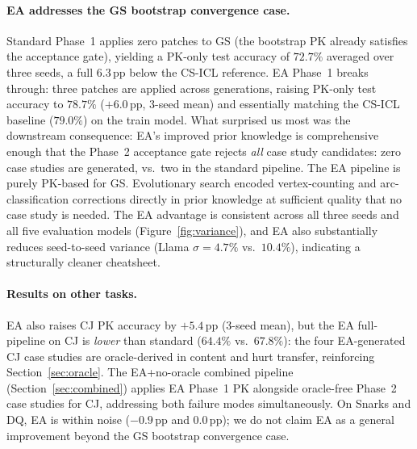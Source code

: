 \documentclass{article}
\begin{document}
\paragraph{EA addresses the GS bootstrap convergence case.}
Standard Phase~1 applies zero patches to GS (the bootstrap PK already satisfies the acceptance
gate), yielding a PK-only test accuracy of $72.7\%$ averaged over three seeds, a full
$6.3$\,pp below the CS-ICL reference.
EA Phase~1 breaks through: three patches are applied across generations, raising PK-only
test accuracy to $78.7\%$ ($+6.0$\,pp, 3-seed mean) and essentially matching the CS-ICL
baseline ($79.0\%$) on the train model.
What surprised us most was the downstream consequence: EA's improved prior knowledge is
comprehensive enough that the Phase~2 acceptance gate rejects \emph{all} case study candidates:
zero case studies are generated, vs.\ two in the standard pipeline.
The EA pipeline is purely PK-based for GS.
Evolutionary search encoded vertex-counting and arc-classification corrections directly in
prior knowledge at sufficient quality that no case study is needed.
The EA advantage is consistent across all three seeds and all five evaluation models
(Figure~\ref{fig:variance}), and EA also substantially reduces seed-to-seed variance
(Llama $\sigma=4.7\%$ vs.\ $10.4\%$), indicating a structurally cleaner cheatsheet.

\paragraph{Results on other tasks.}
EA also raises CJ PK accuracy by $+5.4$\,pp (3-seed mean), but the EA full-pipeline on CJ
is \emph{lower} than standard ($64.4\%$ vs.\ $67.8\%$): the four EA-generated CJ case studies
are oracle-derived in content and hurt transfer, reinforcing Section~\ref{sec:oracle}.
The EA+no-oracle combined pipeline (Section~\ref{sec:combined}) applies EA Phase~1 PK
alongside oracle-free Phase~2 case studies for CJ, addressing both failure modes simultaneously.
On Snarks and DQ, EA is within noise ($-0.9$\,pp and $0.0$\,pp); we do not claim EA
as a general improvement beyond the GS bootstrap convergence case.
\end{document}
